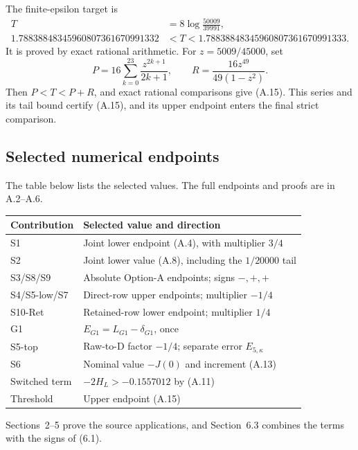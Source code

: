 {The finite-epsilon target is
\[
\begin{aligned}
 T&=8\log\frac{50009}{39991},\\
 1.78838848345960807361670991332&<T
 <1.78838848345960807361670991333.
\end{aligned}\tag{A.15}
\]
It is proved by exact rational arithmetic. For
$z=5009/45000$, set
\[
 P=16\sum_{k=0}^{23}\frac{z^{2k+1}}{2k+1},\qquad
 R=\frac{16z^{49}}{49(1-z^2)}.
\]
Then $P<T<P+R$, and exact rational comparisons give (A.15).
This series and its tail bound certify (A.15),
and its upper endpoint enters the final strict comparison.

\subsection{Selected numerical endpoints}

The table below lists the selected values.
The full endpoints and proofs are in A.2--A.6.
\begin{longtable}{@{}p{9em}p{\dimexpr\textwidth-9em-4\tabcolsep\relax}@{}}
\toprule
Contribution & Selected value and direction \\
\midrule
S1 & Joint lower endpoint (A.4), with multiplier $3/4$ \\
S2 & Joint lower value (A.8), including the $1/20000$ tail \\
S3/S8/S9 & Absolute Option-A endpoints; signs $-,+,+$ \\
S4/S5-low/S7 & Direct-row upper endpoints; multiplier $-1/4$ \\
S10-Ret & Retained-row lower endpoint; multiplier $1/4$ \\
G1 & $E_{G1}=L_{G1}-\delta_{G1}$, once \\
S5-top & Raw-to-D factor $-1/4$; separate error $E_{5,\kappa}$ \\
S6 & Nominal value $-J(0)$ and increment (A.13) \\
Switched term & $-2H_L>-0.1557012$ by (A.11) \\
Threshold & Upper endpoint (A.15) \\
\bottomrule
\end{longtable}
Sections~2--5 prove the source applications,
and Section~6.3 combines the terms with the signs of (6.1).
}
